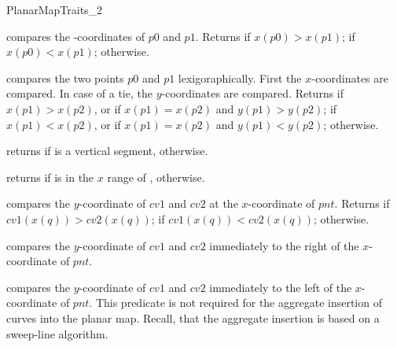 \begin{ccRefConcept}{PlanarMapTraits_2}

         {compares the -coordinates of $p0$ and $p1$.  Returns
           if $x(p0) > x(p1)$;  if
	  $x(p0) < x(p1)$;  otherwise.}
    
	 {compares the two points $p0$ and $p1$ lexigoraphically. First the
	   $x$-coordinates are compared. In case of a tie, the $y$-coordinates
	   are compared. Returns  if $x(p1) > x(p2)$, or if
	   $x(p1) = x(p2)$ and $y(p1) > y(p2)$;
	    if $x(p1) < x(p2)$, or if $x(p1) = x(p2)$ and
	   $y(p1) < y(p2)$;
	    otherwise.}

         {returns  if  is a vertical segment, 
           otherwise.}
        
         {returns  if  is in the $x$ range of
          ,  otherwise.}
    
         {compares the $y$-coordinate of $cv1$ and $cv2$ at the $x$-coordinate 
          of $pnt$. Returns  if $cv1(x(q)) > cv2(x(q))$;
           if $cv1(x(q)) < cv2(x(q))$; 
	  otherwise.
          }

         {compares the $y$-coordinate of $cv1$ and $cv2$ immediately to the
	   right of the $x$-coordinate of $pnt$.
           }
    
         {compares the $y$-coordinate of $cv1$ and $cv2$ immediately to the
           left of the $x$-coordinate of $pnt$. This predicate is not
	   required for the aggregate insertion of curves into the planar map.
	   Recall, that the aggregate insertion is based on a sweep-line
	   algorithm.
           }
    

\end{ccRefConcept}
